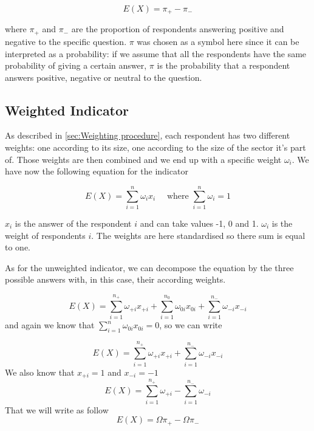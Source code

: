 \documentclass[12pt,a4paper,oneside]{book}
\begin{document}
\begin{equation}
    E(X) = \pi_+ - \pi_-  \label{eq: BSI Unweighted}
\end{equation}

where $\pi_+$ and $\pi_-$ are the proportion of respondents answering positive and negative to the specific question.
$\pi$ was chosen as a symbol here since it can be interpreted as a probability: if we assume that all the respondents have the same probability of giving a certain answer, $\pi$ is the probability that a respondent answers positive, negative or neutral to the question. 


\subsection{Weighted Indicator}

As described in \autoref{sec:Weighting procedure}, each respondent has two different weights: one according to its size, one according to the size of the sector it's part of. Those weights are then combined and we end up with a specific weight $\omega_i$.
We have now the following equation for the indicator

\begin{equation}
    E(X) = \sum_{i=1}^n \omega_i x_i  \quad \text{  where  } \sum_{i=1}^n \omega_i =  1
\end{equation} 

$x_i$ is the answer of the respondent $i$ and can take values -1, 0 and 1.
$\omega_i$ is the weight of respondents $i$. 
The weights are here standardised so there sum is equal to one.

As for the unweighted indicator, we can decompose the equation by the three possible answers with, in this case, their according weights.

\begin{equation}
    E(X) = \sum_{i=1}^{n_+} \omega_{+i} x_{+i} + \sum_{i=1}^{n_0} \omega_{0i} x_{0i} + \sum_{i=1}^{n_-} \omega_{-i} x_{-i}
 \end{equation}
and again we know that $\sum_{i=1}^n \omega_{0i} x_{0i} = 0$, so we can write

\begin{equation}
    E(X) = \sum_{i=1}^{n_+} \omega_{+i} x_{+i} + \sum_{i=1}^{n_-} \omega_{-i} x_{-i}
\end{equation} 
We also know that $x_{+i} = 1$  and $x_{-i}=-1$  
\begin{equation}
    E(X) = \sum_{i=1}^{n_+} \omega_{+i}  - \sum_{i=1}^{n_-} \omega_{-i}
\end{equation}
That we will write as follow
\begin{equation}
    E(X) = \Omega \pi_+ - \Omega \pi_- \label{eq: BSI Weighted}
\end{equation}
\end{document}
